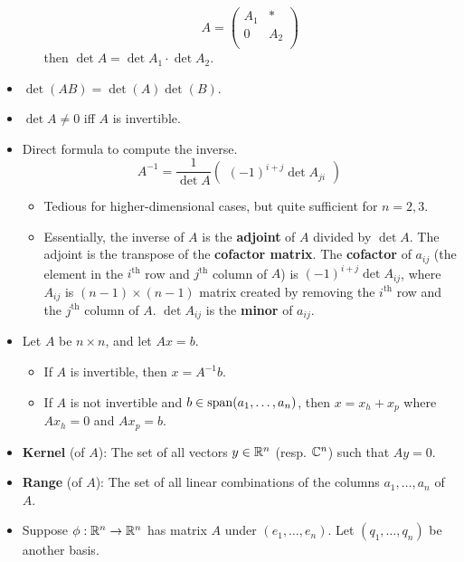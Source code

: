 \documentclass[../notes.tex]{subfiles}
\begin{document}
\begin{itemize}
\begin{itemize}
        \begin{equation*}
            A =
            \begin{pmatrix}
                A_1 & *\\
                0 & A_2\\
            \end{pmatrix}
        \end{equation*}
        then $\det A=\det A_1\cdot\det A_2$.
    \end{itemize}
    \item $\det(AB)=\det(A)\det(B)$.
    \item $\det A\neq 0$ iff $A$ is invertible.
    \item Direct formula to compute the inverse.
    \begin{equation*}
        A^{-1} = \frac{1}{\det A}
        \begin{pmatrix}
            (-1)^{i+j}\det A_{ji}
        \end{pmatrix}
    \end{equation*}
    \begin{itemize}
        \item Tedious for higher-dimensional cases, but quite sufficient for $n=2,3$.
        \item Essentially, the inverse of $A$ is the \textbf{adjoint} of $A$ divided by $\det A$. The adjoint is the transpose of the \textbf{cofactor matrix}. The \textbf{cofactor} of $a_{ij}$ (the element in the $i^\text{th}$ row and $j^\text{th}$ column of $A$) is $(-1)^{i+j}\det A_{ij}$, where $A_{ij}$ is $(n-1)\times(n-1)$ matrix created by removing the $i^\text{th}$ row and the $j^\text{th}$ column of $A$. $\det A_{ij}$ is the \textbf{minor} of $a_{ij}$.
    \end{itemize}
    \item Let $A$ be $n\times n$, and let $Ax=b$.
    \begin{itemize}
        \item If $A$ is invertible, then $x=A^{-1}b$.
        \item If $A$ is not invertible and $b\in\operatorname{span}(a_1,\dots,a_n)$, then $x=x_h+x_p$ where $Ax_h=0$ and $Ax_p=b$.
    \end{itemize}
    \item \textbf{Kernel} (of $A$): The set of all vectors $y\in\mathbb{R}^n$ (resp. $\mathbb{C}^n$) such that $Ay=0$.
    \item \textbf{Range} (of $A$): The set of all linear combinations of the columns $a_1,\dots,a_n$ of $A$.
    \item Suppose $\phi:\mathbb{R}^n\to\mathbb{R}^n$ has matrix $A$ under $(e_1,\dots,e_n)$. Let $(q_1,\dots,q_n)$ be another basis.

\end{itemize}
\end{document}
